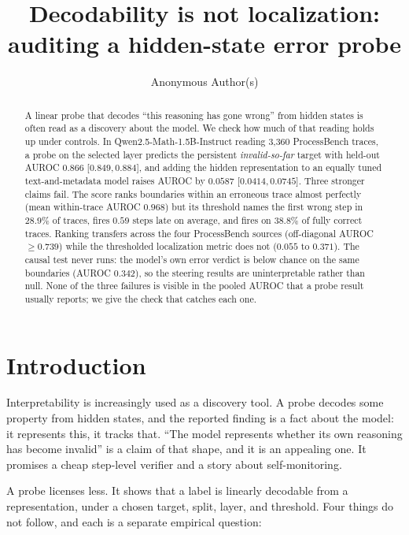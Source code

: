 \documentclass{article}
\title{Decodability is not localization:\\auditing a hidden-state error probe}
\author{Anonymous Author(s)}
\newcommand{\model}{Qwen2.5-Math-1.5B-Instruct}
\newcommand{\dataset}{ProcessBench}
\begin{document}
\maketitle

\begin{abstract}
A linear probe that decodes ``this reasoning has gone wrong'' from hidden states is often read as
a discovery about the model. We check how much of that reading holds up under controls. In
\model{} reading 3,360 \dataset{} traces, a probe on the selected layer predicts the persistent
\emph{invalid-so-far} target with held-out AUROC $0.866$ [$0.849,0.884$], and adding the hidden
representation to an equally tuned text-and-metadata model raises AUROC by $0.0587$
[$0.0414,0.0745$]. Three stronger claims fail. The score ranks boundaries within an erroneous trace
almost perfectly (mean within-trace AUROC $0.968$) but its threshold names the first wrong step in
$28.9\%$ of traces, fires $0.59$ steps late on average, and fires on $38.8\%$ of fully correct
traces. Ranking transfers across the four \dataset{} sources (off-diagonal AUROC $\geq 0.739$)
while the thresholded localization metric does not ($0.055$ to $0.371$). The causal test never
runs: the model's own error verdict is below chance on the same boundaries (AUROC $0.342$), so the
steering results are uninterpretable rather than null. None of the three failures is visible in the
pooled AUROC that a probe result usually reports; we give the check that catches each one.
\end{abstract}

\section{Introduction}

Interpretability is increasingly used as a discovery tool. A probe decodes some property
from hidden states, and the reported finding is a fact about the model: it represents this, it
tracks that. ``The model represents whether its own reasoning has become invalid'' is a claim of
that shape, and it is an appealing one. It promises a cheap step-level verifier and a story about
self-monitoring.

A probe licenses less. It shows that a label is linearly decodable from a representation, under a
chosen target, split, layer, and threshold. Four things do not follow, and each is a separate
empirical question:
\end{document}
